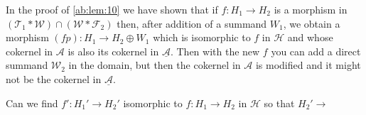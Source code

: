 \begin{rmk}
  In the proof of \cref{ab:lem:10} we have shown that if $f:H_1\to H_2$ is a morphism in
  $(\mathcal{T}_1\ast\mathcal{W})\cap(\mathcal{W}\ast\mathcal{F}_2)$ then, after addition of a summand $W_1$,
  we obtain a morphism $(f p):H_1\to H_2\oplus W_1$ which is isomorphic  to $f$
  in $\mathcal{H}$ and whose cokernel in $\mathcal{A}$ is also its cokernel in $\underline{\mathcal{A}}$.
  Then with the new $f$ you can add a direct summand $\mathcal{W}_2$ in the domain, but then
  the cokernel in $\mathcal{A}$ is modified and it might not be the cokernel in $\underline{\mathcal{A}}$.
\end{rmk}

\begin{question}
  Can we find $f':H_1'\to H_2'$ isomorphic to $f:H_1\to H_2$ in $\mathcal{H}$ so that
  $H_2'\to$
\end{question}

